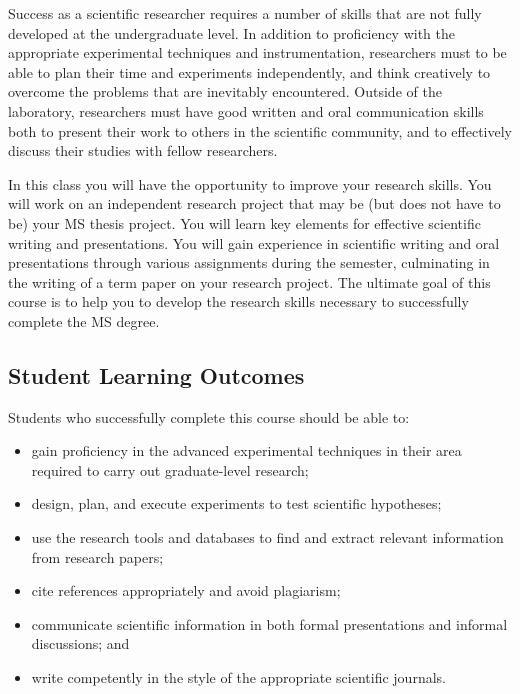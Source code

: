 Success as a scientific researcher requires a number of skills that are
not fully developed at the undergraduate level. In addition to
proficiency with the appropriate experimental techniques and
instrumentation, researchers must to be able to plan their time and
experiments independently, and think creatively to overcome the problems
that are inevitably encountered. Outside of the laboratory, researchers
must have good written and oral communication skills both to present
their work to others in the scientific community, and to effectively
discuss their studies with fellow researchers.

In this class you will have the opportunity to improve your research
skills. You will work on an independent research project that may be
(but does not have to be) your MS thesis project. You will learn key
elements for effective scientific writing and presentations. You will
gain experience in scientific writing and oral presentations through
various assignments during the semester, culminating in the writing of a
term paper on your research project. The ultimate goal of this course is
to help you to develop the research skills necessary to successfully
complete the MS degree.

\hypertarget{slo}{%
\subsection{Student Learning Outcomes}\label{slo}}

Students who successfully complete this course should be able to:

\begin{itemize}
\tightlist
\item
  gain proficiency in the advanced experimental techniques in their area
  required to carry out graduate-level research;
\item
  design, plan, and execute experiments to test scientific hypotheses;
\item
  use the research tools and databases to find and extract relevant
  information from research papers;
\item
  cite references appropriately and avoid plagiarism;
\item
  communicate scientific information in both formal presentations and
  informal discussions; and
\item
  write competently in the style of the appropriate scientific journals.
\end{itemize}

